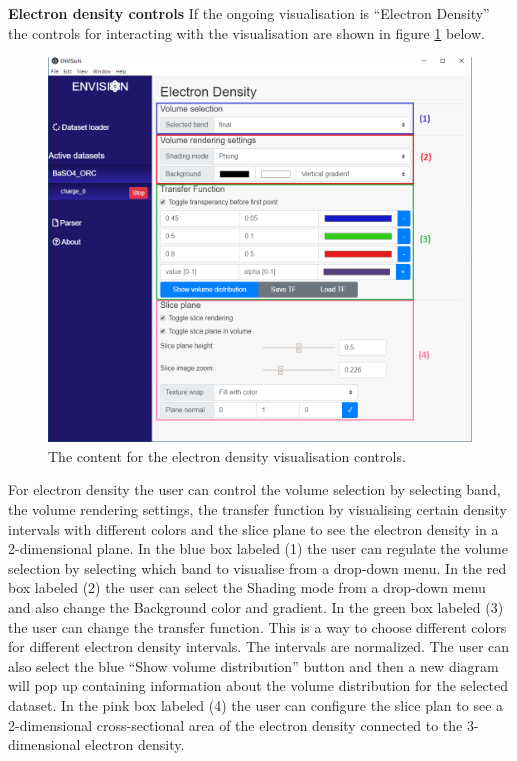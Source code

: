 \textbf{Electron density controls}
\newline
If the ongoing visualisation is ``Electron Density'' the controls for interacting with the visualisation are shown in figure \ref{fig:GUICharge} below.

\begin{figure}[H]
    \centering
    \includegraphics[scale = 0.56]{images/GUI_Chargecontent.png}
    \caption{The content for the electron density visualisation controls.}
    \label{fig:GUICharge}
\end{figure}

For electron density the user can control the volume selection by selecting band, the volume rendering settings, the transfer function by visualising certain density intervals with different colors and the slice plane to see the electron density in a 2-dimensional plane. In the blue box labeled (1) the user can regulate the volume selection by selecting which band to visualise from a drop-down menu. In the red box labeled (2) the user can select the Shading mode from a drop-down menu and also change the Background color and gradient. In the green box labeled (3) the user can change the transfer function. This is a way to choose different colors for different electron density intervals. The intervals are normalized. The user can also select the blue ``Show volume distribution'' button and then a new diagram will pop up containing information about the volume distribution for the selected dataset. In the pink box labeled (4) the user can configure the slice plan to see a 2-dimensional cross-sectional area of the electron density connected to the 3-dimensional electron density.

